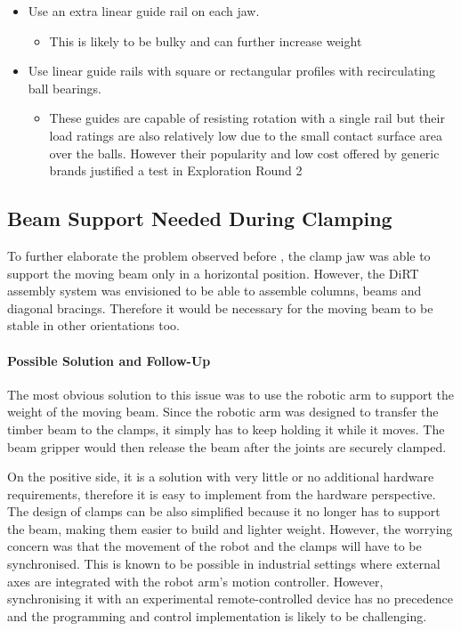 \begin{itemize}[nosep]
    \item Use an extra linear guide rail on each jaw.
    \begin{itemize}
        \item This is likely to be bulky and can further increase weight
    \end{itemize}
    \item Use linear guide rails with square or rectangular profiles with recirculating ball bearings.
    \begin{itemize}
        \item These guides are capable of resisting rotation with a single rail but their load ratings are also relatively low due to the small contact surface area over the balls. However their popularity and low cost offered by generic brands justified a test in Exploration Round 2 
    \end{itemize}
\end{itemize}
        
\subsection{Beam Support Needed During Clamping}
\label{subsection:exploration-1-beam-support-needed-during-clamping}

To further elaborate the problem observed before , the clamp jaw was able to support the moving beam only in a horizontal position. However, the DiRT assembly system was envisioned to be able to assemble columns, beams and diagonal bracings. Therefore it would be necessary for the moving beam to be stable in other orientations too.

\paragraph{Possible Solution and Follow-Up}

The most obvious solution to this issue was to use the robotic arm to support the weight of the moving beam. Since the robotic arm was designed to transfer the timber beam to the clamps, it simply has to keep holding it while it moves. The beam gripper would then release the beam after the joints are securely clamped. 

On the positive side, it is a solution with very little or no additional hardware requirements, therefore it is easy to implement from the hardware perspective. The design of clamps can be also simplified because it no longer has to support the beam, making them easier to build and lighter weight. However, the worrying concern was that the movement of the robot and the clamps will have to be synchronised. This is known to be possible in industrial settings where external axes are integrated with the robot arm’s motion controller. However, synchronising it with an experimental remote-controlled device has no precedence and the programming and control implementation is likely to be challenging.

